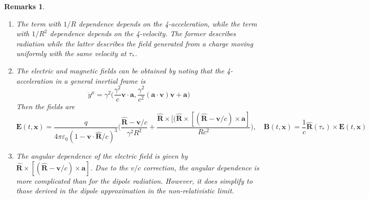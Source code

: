 \documentclass[a4paper]{article}
\newtheorem{remarks}{Remarks}[section]
\theoremstyle{new}
\begin{document}
\begin{remarks}\leavevmode
\begin{enumerate}
    \item The term with $1/R$ dependence depends on the 4-acceleration, while the term with $1/R^2$ dependence depends on the 4-velocity. The former describes radiation while the latter describes the field generated from a charge moving uniformly with the same velocity at $\tau_*$.
    \item The electric and magnetic fields can be obtained by noting that the 4-acceleration in a general inertial frame is
    $$\ddot{y}^\mu=\gamma^2\bigg(\frac{\gamma^2}{c}\mathbf{v}\cdot\mathbf{a},\frac{\gamma^2}{c^2}(\mathbf{a}\cdot\mathbf{v})\mathbf{v}+\mathbf{a}\bigg)$$
    Then the fields are
    $$\mathbf{E}(t,\mathbf{x})=\frac{q}{4\pi\varepsilon_0(1-\mathbf{v}\cdot\mathbf{\hat{R}}/c)^3}\bigg(\frac{\mathbf{\hat{R}}-\mathbf{v}/c}{\gamma^2R^2}+\frac{\mathbf{\hat{R}}\times[(\mathbf{\hat{R}}\times[(\mathbf{\hat{R}}-\mathbf{v}/c)\times\mathbf{a}]}{Rc^2}\bigg),\quad\mathbf{B}(t,\mathbf{x})=\frac{1}{c}\mathbf{\hat{R}}(\tau_*)\times\mathbf{E}(t,\mathbf{x})$$
    \item The angular dependence of the electric field is given by $\mathbf{\hat{R}}\times[(\mathbf{\hat{R}}-\mathbf{v}/c)\times\mathbf{a}]$. Due to the $v/c$ correction, the angular dependence is more complicated than for the dipole radiation. However, it does simplify to those derived in the dipole approximation in the non-relativistic limit.
\end{enumerate}
\end{remarks}
\end{document}
